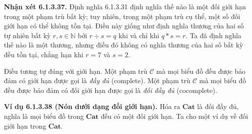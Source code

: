 \noindent\textbf{Nhận xét 6.1.3.37.} Định nghĩa 6.1.3.31 định nghĩa thế nào là một đối giới hạn trong một phạm trù bất kỳ; tuy nhiên, trong một phạm trù cụ thể, một số đối giới hạn có thể không tồn tại. Điều này giống như định nghĩa thương của hai số tự nhiên bất kỳ $r,s\in\mathbb N$ bởi $r\div s=q$ khi và chỉ khi $q*s=r$. Ta đã
định nghĩa thế nào là một thương, nhưng điều đó không có nghĩa thương của hai số bất kỳ đều tồn tại, chẳng hạn khi $r=7$ và $s=2$.

Điều tương tự đúng với giới hạn. Một phạm trù $\mathcal C$ mà mọi biểu đồ đều được bảo đảm có giới hạn được gọi là \emph{đầy đủ} (complete). Một phạm trù $\mathcal C$ mà mọi biểu đồ đều được bảo đảm có đối giới hạn được gọi là \emph{đối đầy đủ} (cocomplete).

\noindent\textbf{Ví dụ 6.1.3.38 (Nón dưới dạng đối giới hạn).} Hóa ra $\mathbf{Cat}$ là đối đầy đủ, nghĩa là mọi biểu đồ trong $\mathbf{Cat}$ đều có một đối giới hạn. Ta cho một ví dụ về đối giới hạn trong $\mathbf{Cat}$.

